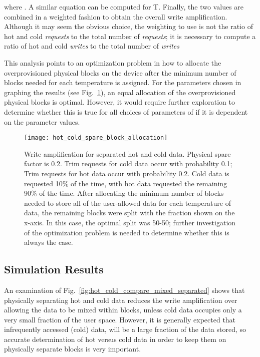 \documentclass[prodmode,acmtos]{acmsmall}
\begin{document}
where .  A similar equation can be computed for T.  Finally, the two values are combined in a weighted fashion to obtain the overall write amplification.  Although it may seem the obvious choice, the weighting to use is not the ratio of hot and cold \emph{requests} to the total number of \emph{requests}; it is necessary to compute a ratio of hot and cold \emph{writes} to the total number of \emph{writes}



This analysis points to an optimization problem in how to allocate the overprovisioned physical blocks on the device after the minimum number of blocks needed for each temperature is assigned.  For the parameters chosen in graphing the results (see Fig.~\ref{fig:hot_cold_spare_block_allocation}), an equal allocation of the overprovisioned physical blocks is optimal.  However, it would require further exploration to determine whether this is true for all choices of parameters of if it is dependent on the parameter values.

\begin{figure}
\centerline{\texttt{[image: hot\_cold\_spare\_block\_allocation]}}
\caption{Write amplification for separated hot and cold data.  Physical spare factor is 0.2.  Trim requests for cold data occur with probability 0.1; Trim requests for hot data occur with probability 0.2.  Cold data is requested 10\% of the time, with hot data requested the remaining 90\% of the time.  After allocating the minimum number of blocks needed to store all of the user-allowed data for each temperature of data, the remaining blocks were split with the fraction shown on the x-axis.  In this case, the optimal split was 50-50; further investigation of the optimization problem is needed to determine whether this is always the case.}
\label{fig:hot_cold_spare_block_allocation}
\end{figure}

\subsection{Simulation Results}
An examination of Fig.~\ref{fig:hot_cold_compare_mixed_separated} shows that physically separating hot and cold data reduces the write amplification over allowing the data to be mixed within blocks, unless cold data occupies only a very small fraction of the user space.  However, it is generally expected that infrequently accessed (cold) data, will be a large fraction of the data stored, so accurate determination of hot versus cold data in order to keep them on physically separate blocks is very important.
\end{document}

